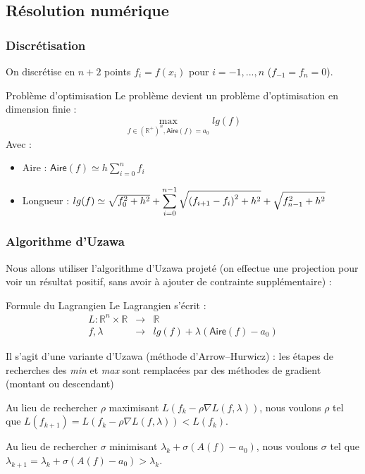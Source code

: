 \documentclass[11pt,envcountsect,aspectratio=169]{beamer} %
\newcommand{\R}{\mathbb{R}}
\newcommand{\A}{\mathsf{Aire}}
\begin{document}
\subsection{Résolution numérique}

\begin{frame}
    \frametitle{Discrétisation}

    On discrétise en $n+2$ points $f_i = f(x_i)$ pour $i=-1,...,n$ ($f_{-1}=f_n=0$).

    \begin{beamerboxesrounded}[upper=titreB,lower=texteB,shadow=true]{Problème d'optimisation}
        Le problème devient un problème d'optimisation en dimension finie :
        \[\max_{f \in \left(\R^+\right)^n, \A(f)=a_0} lg(f)\]
        Avec :
        \begin{itemize}
            \item Aire : $\A(f) \simeq h \sum_{i=0}^n{f_i}$
            \item Longueur : $lg(f) \simeq  \sqrt{f_0^2+h^2} + \displaystyle\sum_{i=0}^{n-1}{\sqrt{\vphantom{f_n^2}{(f_{i+1}-f_i)}^2+h^2}} + \sqrt{f_{n-1}^2+h^2} $
        \end{itemize}
    \end{beamerboxesrounded}

\end{frame}

\begin{frame}
    \frametitle{Algorithme d'Uzawa}
    
    Nous allons utiliser l'algorithme d'Uzawa projeté (on effectue une projection pour voir un résultat positif, sans avoir à ajouter de contrainte supplémentaire) :
    
    \begin{beamerboxesrounded}[upper=titreB,lower=texteB,shadow=true]{Formule du Lagrangien}
        Le Lagrangien s'écrit :
        \begin{eqnarray*}
            L \colon \R^n \times \R &\rightarrow & \R \\
            f, \lambda &\rightarrow & lg(f) + \lambda (\A(f)-a_0)
        \end{eqnarray*}
    \end{beamerboxesrounded}

    Il s'agit d'une variante d'Uzawa (méthode d'Arrow--Hurwicz) : les étapes de recherches des \emph{min} et \emph{max} sont remplacées par des méthodes de gradient (montant ou descendant)
    
    Au lieu de rechercher $\rho$ maximisant $L(f_k - \rho \nabla L(f,\lambda))$, nous voulons $\rho$ tel que $L(f_{k+1}) = L(f_k - \rho \nabla L(f,\lambda)) < L(f_k)$.
    
    Au lieu de rechercher $\sigma$ minimisant $\lambda_k + \sigma (A(f)-a_0)$, nous voulons $\sigma$ tel que $\lambda_{k+1} = \lambda_k + \sigma (A(f)-a_0) > \lambda_k$.

\end{frame}
\end{document}
